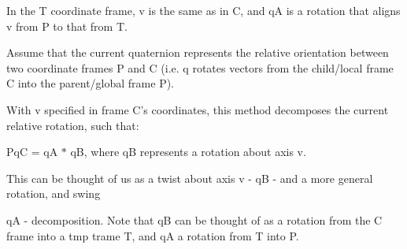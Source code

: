In the T coordinate frame, v is the same as in C, and qA is a rotation that aligns v from P to that from T.

Assume that the current quaternion represents the relative orientation between two coordinate frames P and C (i.e. q rotates vectors from the child/local frame C into the parent/global frame P).

With v specified in frame C's coordinates, this method decomposes the current relative rotation, such that:

PqC = qA $\ast$ qB, where qB represents a rotation about axis v.

This can be thought of us as a twist about axis v -\/ qB -\/ and a more general rotation, and swing
\begin{DoxyItemize}
\item qA -\/ decomposition. Note that qB can be thought of as a rotation from the C frame into a tmp trame T, and qA a rotation from T into P.
\end{DoxyItemize}

